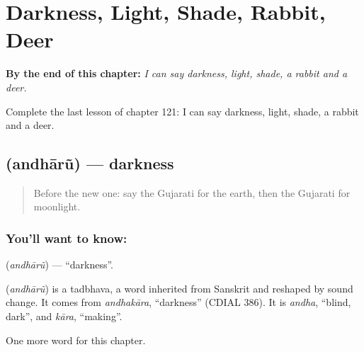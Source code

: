 
\chapter{Darkness, Light, Shade, Rabbit, Deer}
\label{ch:gu-darkness-light-shade-rabbit-deer}

\begin{chapteropening}
\textbf{By the end of this chapter:} \emph{I can say darkness, light, shade, a rabbit and a deer.}

Complete the last lesson of chapter 121: I can say darkness, light, shade, a rabbit and a deer.
\end{chapteropening}

\section[\texorpdfstring{\gu{અંધારું} (andhārũ)}{અંધારું (andhārũ)}]{ (andhārũ) — darkness}

\label{lesson:GU-C121-andharu}



\begin{quote}
Before the new one: say the Gujarati for the earth, then the Gujarati for moonlight.
\end{quote}

\subsection*{You'll want to know: }
\textbf{} (\emph{andhārũ}) — \textquotedblleft{}darkness\textquotedblright{}.

\begin{cousinweb}
\textbf{} (\emph{andhārũ}) is a tadbhava, a word inherited from Sanskrit and reshaped by sound change. It comes from \emph{andhakāra}, \textquotedblleft{}darkness\textquotedblright{} (CDIAL 386). It is \emph{andha}, \textquotedblleft{}blind, dark\textquotedblright{}, and \emph{kāra}, \textquotedblleft{}making\textquotedblright{}.
\end{cousinweb}

\begin{grammarlens}[title={What you've built}]
One more word for this chapter.
\end{grammarlens}

